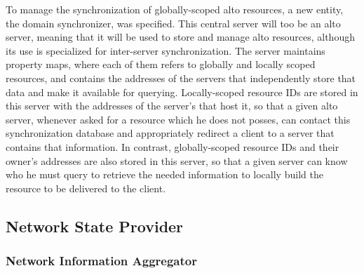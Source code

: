     To manage the synchronization of globally-scoped \gls{alto} resources, a new entity, the domain synchronizer, was specified.
    This central server will too be an \gls{alto} server, meaning that it will be used to store and manage \gls{alto} resources, although its use is specialized for inter-server synchronization.
    The server maintains property maps, where each of them refers to globally and locally scoped resources, and contains the addresses of the servers that independently store that data and make it available for querying.
    Locally-scoped resource IDs are stored in this server with the addresses of the server's that host it, so that a given \gls{alto} server, whenever asked for a resource which he does not posses, can contact this synchronization database and appropriately redirect a client to a server that contains that information.
    In contrast, globally-scoped resource IDs and their owner's addresses are also stored in this server, so that a given server can know who he must query to retrieve the needed information to locally build the resource to be delivered to the client.



\subsection{Network State Provider}

\subsubsection{Network Information Aggregator}

